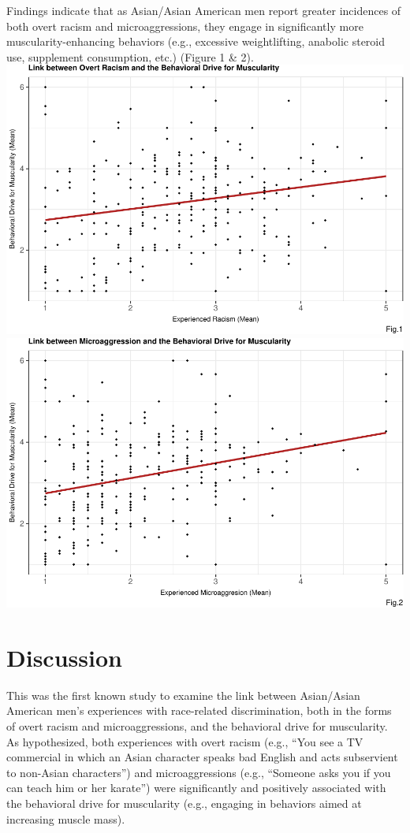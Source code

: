 \documentclass[
  english,
  man, fleqn, noextraspace,floatsintext]{apa6}
\begin{document}
Findings indicate that as Asian/Asian American men report greater incidences of both overt racism and microaggressions, they engage in significantly more muscularity-enhancing behaviors (e.g., excessive weightlifting, anabolic steroid use, supplement consumption, etc.) (Figure 1 \& 2).
\includegraphics{final_project_files/figure-latex/ggplot-1.pdf} \includegraphics{final_project_files/figure-latex/ggplot-2.pdf}

\hypertarget{discussion}{%
\section{Discussion}\label{discussion}}

This was the first known study to examine the link between Asian/Asian American men's experiences with race-related discrimination, both in the forms of overt racism and microaggressions, and the behavioral drive for muscularity. As hypothesized, both experiences with overt racism (e.g., ``You see a TV commercial in which an Asian character speaks bad English and acts subservient to non-Asian characters'') and microaggressions (e.g., ``Someone asks you if you can teach him or her karate'') were significantly and positively associated with the behavioral drive for muscularity (e.g., engaging in behaviors aimed at increasing muscle mass).
\end{document}
